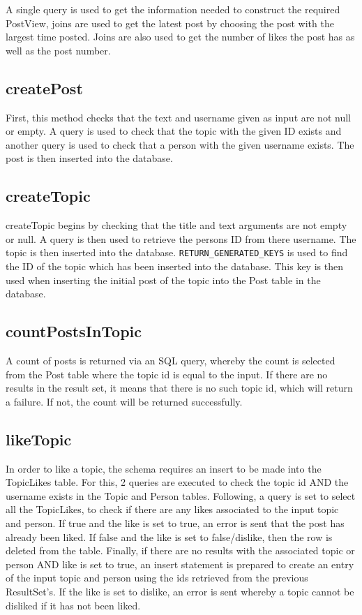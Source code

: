 \documentclass{article}
\begin{document}
A single query is used to get the information needed to construct the required PostView, joins are used to get the latest post by choosing the post with the largest time posted. Joins are also used to get the number of likes the post has as well as the post number.

\subsection*{createPost}

First, this method checks that the text and username given as input are not null or empty. A query is used to check that the topic with the given ID exists and another query is used to check that a person with the given username exists. The post is then inserted into the database.

\subsection*{createTopic}

createTopic begins by checking that the title and text arguments are not empty or null. A query is then used to retrieve the persons ID from there username. The topic is then inserted into the database. \texttt{RETURN\_GENERATED\_KEYS} is used to find the ID of the topic which has been inserted into the database. This key is then used when inserting the initial post of the topic into the Post table in the database.

\subsection*{countPostsInTopic}

A count of posts is returned via an SQL query, whereby the count is selected from the Post table where the topic id is equal to the input. If there are no results in the result set, it means that there is no such topic id, which will return a failure. If not, the count will be returned successfully.

\subsection*{likeTopic}

In order to like a topic, the schema requires an insert to be made into the TopicLikes table. For this, 2 queries are executed to check the topic id AND the username exists in the Topic and Person tables. Following, a query is set to select all the TopicLikes, to check if there are any likes associated to the input topic and person. If true and the like is set to true, an error is sent that the post has already been liked. If false and the like is set to false/dislike, then the row is deleted from the table.
Finally, if there are no results with the associated topic or person AND like is set to true, an insert statement is prepared to create an entry of the input topic and person using the ids retrieved from the previous ResultSet’s. If the like is set to dislike, an error is sent whereby a topic cannot be disliked if it has not been liked.
\end{document}
